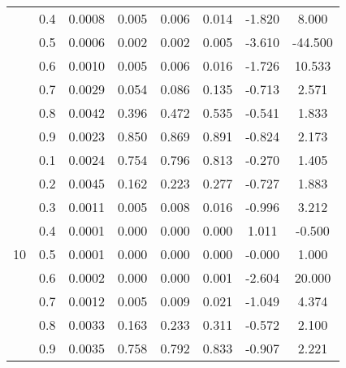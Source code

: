 \documentclass[11pt,a4paper]{report}
\begin{document}
\begin{longtable}{ | c | c || c | c | c | c | c | c | }
 & 0.4 & 0.0008 & 0.005 & 0.006 & 0.014 & -1.820 & 8.000 \\
 & 0.5 & 0.0006 & 0.002 & 0.002 & 0.005 & -3.610 & -44.500 \\
 & 0.6 & 0.0010 & 0.005 & 0.006 & 0.016 & -1.726 & 10.533 \\
 & 0.7 & 0.0029 & 0.054 & 0.086 & 0.135 & -0.713 & 2.571 \\
 & 0.8 & 0.0042 & 0.396 & 0.472 & 0.535 & -0.541 & 1.833 \\
 & 0.9 & 0.0023 & 0.850 & 0.869 & 0.891 & -0.824 & 2.173 \\
 \hline
\multirow{9}{*}{10} & 0.1 & 0.0024 & 0.754 & 0.796 & 0.813 & -0.270 & 1.405 \\
 & 0.2 & 0.0045 & 0.162 & 0.223 & 0.277 & -0.727 & 1.883 \\
 & 0.3 & 0.0011 & 0.005 & 0.008 & 0.016 & -0.996 & 3.212 \\
 & 0.4 & 0.0001 & 0.000 & 0.000 & 0.000 & 1.011 & -0.500 \\
 & 0.5 & 0.0001 & 0.000 & 0.000 & 0.000 & -0.000 & 1.000 \\
 & 0.6 & 0.0002 & 0.000 & 0.000 & 0.001 & -2.604 & 20.000 \\
 & 0.7 & 0.0012 & 0.005 & 0.009 & 0.021 & -1.049 & 4.374 \\
 & 0.8 & 0.0033 & 0.163 & 0.233 & 0.311 & -0.572 & 2.100 \\
 & 0.9 & 0.0035 & 0.758 & 0.792 & 0.833 & -0.907 & 2.221 \\
 \hline
\hline
\end{longtable}
\end{document}
